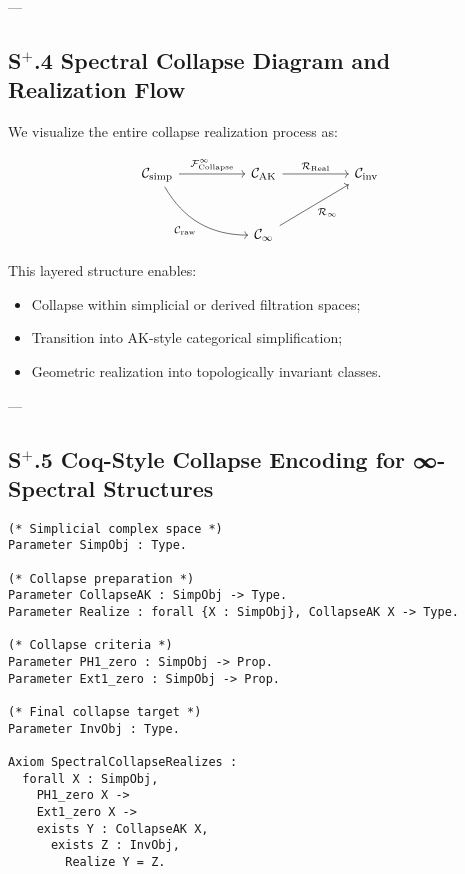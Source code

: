 \documentclass[11pt]{article}
\begin{document}
---

\subsection*{S$^{+}$.4 Spectral Collapse Diagram and Realization Flow}

We visualize the entire collapse realization process as:

\[
\begin{tikzcd}[column sep=huge, row sep=large]
\mathcal{C}_{\mathrm{simp}} 
  \arrow[r, "\mathcal{F}_{\mathrm{Collapse}}^\infty"] 
  \arrow[dr, bend right, swap, "\mathcal{C}_{\mathrm{raw}}"]
&
\mathcal{C}_{\mathrm{AK}} 
  \arrow[r, "\mathcal{R}_{\mathrm{Real}}"]
&
\mathcal{C}_{\mathrm{inv}} \\
& \mathcal{C}_\infty 
  \arrow[ur, swap, "\mathcal{R}_{\infty}"]
\end{tikzcd}
\]

This layered structure enables:

\begin{itemize}
    \item Collapse within simplicial or derived filtration spaces;
    \item Transition into AK-style categorical simplification;
    \item Geometric realization into topologically invariant classes.
\end{itemize}

---

\subsection*{S$^{+}$.5 Coq-Style Collapse Encoding for ∞-Spectral Structures}

\begin{lstlisting}[language=Coq, mathescape=false]
(* Simplicial complex space *)
Parameter SimpObj : Type.

(* Collapse preparation *)
Parameter CollapseAK : SimpObj -> Type.
Parameter Realize : forall {X : SimpObj}, CollapseAK X -> Type.

(* Collapse criteria *)
Parameter PH1_zero : SimpObj -> Prop.
Parameter Ext1_zero : SimpObj -> Prop.

(* Final collapse target *)
Parameter InvObj : Type.

Axiom SpectralCollapseRealizes :
  forall X : SimpObj,
    PH1_zero X ->
    Ext1_zero X ->
    exists Y : CollapseAK X,
      exists Z : InvObj,
        Realize Y = Z.
\end{lstlisting}
\end{document}
